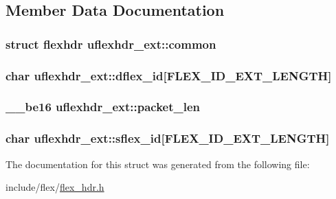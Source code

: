 \subsection{Member Data Documentation}
\subsubsection[{\texorpdfstring{common}{common}}]{\setlength{\rightskip}{0pt plus 5cm}struct {\bf flexhdr} uflexhdr\+\_\+ext\+::common}\hypertarget{structuflexhdr__ext_af481d03a7524a0f483e6fd8877c00563}{}\label{structuflexhdr__ext_af481d03a7524a0f483e6fd8877c00563}
\subsubsection[{\texorpdfstring{dflex\+\_\+id}{dflex_id}}]{\setlength{\rightskip}{0pt plus 5cm}char uflexhdr\+\_\+ext\+::dflex\+\_\+id\mbox{[}{\bf F\+L\+E\+X\+\_\+\+I\+D\+\_\+\+E\+X\+T\+\_\+\+L\+E\+N\+G\+TH}\mbox{]}}\hypertarget{structuflexhdr__ext_a61d75d5fd362fb576a53fa8f973c2380}{}\label{structuflexhdr__ext_a61d75d5fd362fb576a53fa8f973c2380}
\subsubsection[{\texorpdfstring{packet\+\_\+len}{packet_len}}]{\setlength{\rightskip}{0pt plus 5cm}\+\_\+\+\_\+be16 uflexhdr\+\_\+ext\+::packet\+\_\+len}\hypertarget{structuflexhdr__ext_aa8dd1115a6af281d1a91102926d5cd4d}{}\label{structuflexhdr__ext_aa8dd1115a6af281d1a91102926d5cd4d}
\subsubsection[{\texorpdfstring{sflex\+\_\+id}{sflex_id}}]{\setlength{\rightskip}{0pt plus 5cm}char uflexhdr\+\_\+ext\+::sflex\+\_\+id\mbox{[}{\bf F\+L\+E\+X\+\_\+\+I\+D\+\_\+\+E\+X\+T\+\_\+\+L\+E\+N\+G\+TH}\mbox{]}}\hypertarget{structuflexhdr__ext_abf9a4c10efddc6b46acf9e25915cdcb3}{}\label{structuflexhdr__ext_abf9a4c10efddc6b46acf9e25915cdcb3}


The documentation for this struct was generated from the following file\+:\begin{DoxyCompactItemize}
\item 
include/flex/\hyperlink{flex__hdr_8h}{flex\+\_\+hdr.\+h}\end{DoxyCompactItemize}
